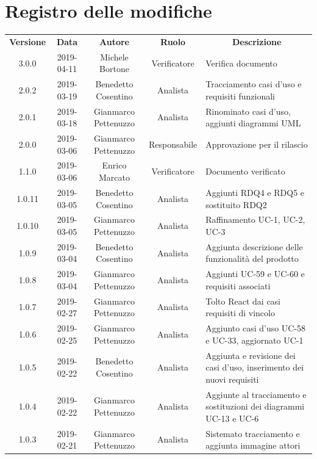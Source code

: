 \documentclass[11pt,a4paper]{article}
\begin{document}
	
	{\def\arraystretch{2}\tabcolsep=10pt
	\newpage
	\section*{\centering Registro delle modifiche}
	\begin{tabularx}{\textwidth}{ c | c | c | c | X }
		\rowcolor{LightBlue}
		\color{white}\bfseries Versione & \color{white}\bfseries Data & \color{white}\bfseries Autore & \color{white}\bfseries Ruolo & \multicolumn{1}{c}{\color{white}\bfseries Descrizione}\\[0.25cm]
		3.0.0 & 2019-04-11 & Michele Bortone & Verificatore & Verifica documento\\ \hline
		2.0.2 & 2019-03-19 & Benedetto Cosentino & Analista & Tracciamento casi d'uso e requisiti funzionali\\ \hline
		2.0.1 & 2019-03-18 & Gianmarco Pettenuzzo & Analista & Rinominato casi d'uso, aggiunti diagrammi UML\\ \hline
		2.0.0 & 2019-03-06 & Gianmarco Pettenuzzo & Responsabile & Approvazione per il rilascio\\ \hline
		1.1.0 & 2019-03-06 & Enrico Marcato & Verificatore & Documento verificato\\ \hline
		1.0.11 & 2019-03-05 & Benedetto Cosentino & Analista & Aggiunti RDQ4 e RDQ5 e sostituito RDQ2\\ \hline
		1.0.10 & 2019-03-05 & Gianmarco Pettenuzzo & Analista & Raffinamento UC-1, UC-2, UC-3 \\ \hline
		1.0.9 & 2019-03-04 & Benedetto Cosentino & Analista & Aggiunta descrizione delle funzionalità del prodotto\\ \hline
		1.0.8 & 2019-03-04 & Gianmarco Pettenuzzo & Analista & Aggiunti UC-59 e UC-60 e requisiti associati \\ \hline
		1.0.7 & 2019-02-27 & Gianmarco Pettenuzzo & Analista & Tolto React dai casi requisiti di vincolo\\ \hline
		1.0.6 & 2019-02-25 & Gianmarco Pettenuzzo & Analista & Aggiunto casi d'uso UC-58 e UC-33, aggiornato UC-1\\ \hline
		1.0.5 & 2019-02-22 & Benedetto Cosentino & Analista & Aggiunta e revisione dei casi d'uso, inserimento dei nuovi requisiti\\ \hline
		1.0.4 & 2019-02-22 & Gianmarco Pettenuzzo & Analista & Aggiunte al tracciamento e sostituzioni dei diagrammi UC-13 e UC-6\\ \hline
		1.0.3 & 2019-02-21 & Gianmarco Pettenuzzo & Analista & Sistemato tracciamento e aggiunta immagine attori\\ \hline

\end{tabularx}}
\end{document}
